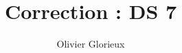 \documentclass[a4paper, 11pt,reqno]{article}
\author{Olivier Glorieux}
\begin{document}
\title{Correction : DS 7
}


%
%
%
%
%
%
%
%
%
%
%
%
%
%
%
%
\end{document}
